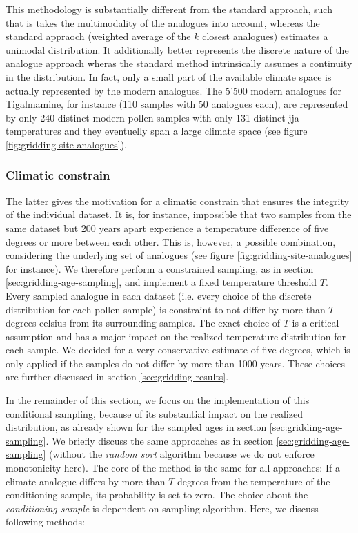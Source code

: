 \begin{refsection}
This methodology is substantially different from the standard approach, such that is takes the multimodality of the analogues into account, whereas the standard appraoch (weighted average of the $k$ closest analogues) estimates a unimodal distribution. It additionally better represents the discrete nature of the analogue approach wheras the standard method intrinsically assumes a continuity in the distribution. In fact, only a small part of the available climate space is actually represented by the modern analogues. The 5'500 modern analogues for Tigalmamine, for instance (110 samples with 50 analogues each), are represented by only 240 distinct modern pollen samples with only 131 distinct \gls{jja} temperatures and they eventuelly span a large climate space (see figure \ref{fig:gridding-site-analogues}).

\subsubsection{Climatic constrain}
The latter gives the motivation for a climatic constrain that ensures the integrity of the individual dataset. It is, for instance, impossible that two samples from the same dataset but 200 years apart experience a temperature difference of five degrees or more between each other. This is, however, a possible combination, considering the underlying set of analogues (see figure \ref{fig:gridding-site-analogues} for instance). We therefore perform a constrained sampling, as in section \ref{sec:gridding-age-sampling}, and implement a fixed temperature threshold $T$. Every sampled analogue in each dataset (i.e. every choice of the discrete distribution for each pollen sample) is constraint to not differ by more than $T$ degrees celsius from its surrounding samples. The exact choice of $T$ is a critical assumption and has a major impact on the realized temperature distribution for each sample. We decided for a very conservative estimate of five degrees, which is only applied if the samples do not differ by more than 1000 years. These choices are further discussed in section \ref{sec:gridding-results}.

In the remainder of this section, we focus on the implementation of this conditional sampling, because of its substantial impact on the realized distribution, as already shown for the sampled ages in section \ref{sec:gridding-age-sampling}. We briefly discuss the same approaches as in section \ref{sec:gridding-age-sampling} (without the \textit{random sort} algorithm because we do not enforce monotonicity here). The core of the method is the same for all approaches: If a climate analogue differs by more than $T$ degrees from the temperature of the conditioning sample, its probability is set to zero. The choice about the \textit{conditioning sample} is dependent on sampling algorithm. Here, we discuss following methods:


\end{refsection}
